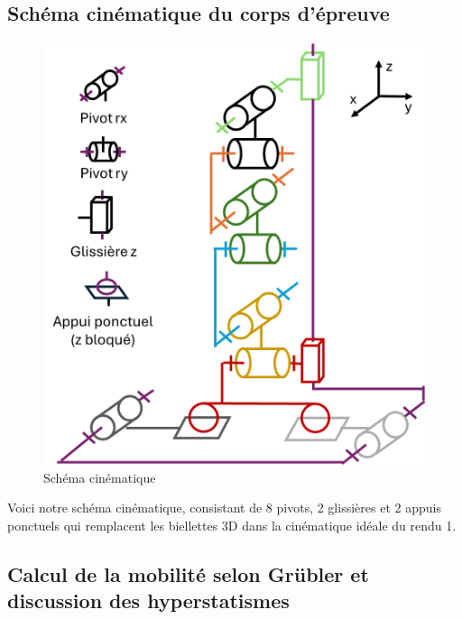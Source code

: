 \documentclass[a4paper, 11pt]{article} %
\begin{document}
\vspace{2em}
\subsection{Schéma cinématique du corps d’épreuve}

\begin{figure}  %
    \centering
    \vspace{-7em}  %
    \includegraphics[width=\linewidth]{images/schéma_cinématique4.png}
    \caption{Schéma cinématique}
    \label{fig:planche}
\end{figure}

Voici notre schéma cinématique, consistant de 8 pivots, 2 glissières et 2 appuis ponctuels qui remplacent les biellettes 3D dans la cinématique idéale du rendu 1.

\vspace{5em}


\newpage
\subsection{Calcul de la mobilité selon Grübler et discussion des hyperstatismes}
\end{document}
